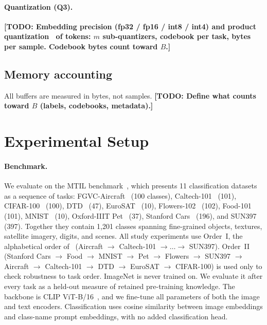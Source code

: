 \documentclass[10pt,twocolumn,letterpaper]{article}
\newcommand{\TODO}[1]{\textbf{\color{red}[TODO: #1]}}
\newcommand{\Q}[1]{\textbf{Q#1}\xspace}     %
\newcommand{\budget}{B}             %
\begin{document}
\paragraph{Quantization (\Q{3}).}
\TODO{Embedding precision (fp32 / fp16 / int8 / int4) and product quantization~\cite{jegou2011pq} of tokens: $m$ sub-quantizers, codebook per task, bytes per sample. Codebook bytes count toward $\budget$.}

\subsection{Memory accounting}
\label{sec:method-memory}
All buffers are measured in bytes, not samples. \TODO{Define what counts toward $\budget$ (labels, codebooks, metadata).}

\section{Experimental Setup}
\label{sec:setup}

\paragraph{Benchmark.}
We evaluate on the MTIL benchmark~\cite{zheng2023zscl}, which presents 11
classification datasets as a sequence of tasks: FGVC-Aircraft~\cite{maji2013fine}
(100 classes), Caltech-101~\cite{fei2004learning} (101),
CIFAR-100~\cite{krizhevsky2009learning} (100), DTD~\cite{cimpoi2014describing} (47),
EuroSAT~\cite{helber2019eurosat} (10), Flowers-102~\cite{nilsback2008automated} (102),
Food-101~\cite{bossard2014food} (101), MNIST~\cite{lecun1998gradient} (10),
Oxford-IIIT Pet~\cite{parkhi2012cats} (37), Stanford Cars~\cite{krause2013collecting}
(196), and SUN397~\cite{xiao2010sun} (397). Together they contain 1{,}201 classes
spanning fine-grained objects, textures, satellite imagery, digits, and scenes.
All study experiments use Order~I, the alphabetical order of~\cite{zheng2023zscl}
(Aircraft $\rightarrow$ Caltech-101 $\rightarrow \dots \rightarrow$ SUN397).
Order~II (Stanford Cars $\rightarrow$ Food $\rightarrow$ MNIST $\rightarrow$ Pet
$\rightarrow$ Flowers $\rightarrow$ SUN397 $\rightarrow$ Aircraft $\rightarrow$
Caltech-101 $\rightarrow$ DTD $\rightarrow$ EuroSAT $\rightarrow$ CIFAR-100) is used
only to check robustness to task order. ImageNet is never trained on. We
evaluate it after every task as a held-out measure of retained pre-training
knowledge. The backbone is CLIP ViT-B/16~\cite{radford2021clip}, and we fine-tune
all parameters of both the image and text encoders. Classification uses cosine
similarity between image embeddings and class-name prompt embeddings, with no
added classification head.
\end{document}
